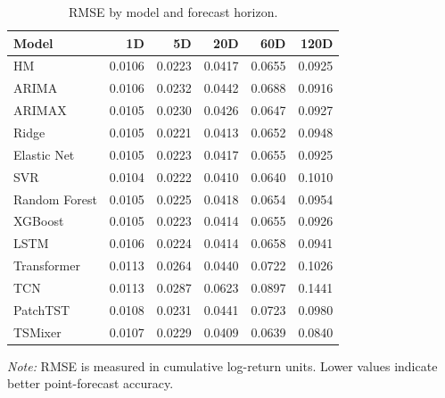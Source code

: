 \documentclass[12pt,twoside]{ord}
\begin{document}
\begin{table}[htbp]
\centering
\caption{RMSE by model and forecast horizon.}\label{tab:rmse_main}
\setlength{\tabcolsep}{4.5pt}
\begin{tabular}{lrrrrr}
\hline
Model & 1D & 5D & 20D & 60D & 120D \\
\hline
HM & 0.0106 & 0.0223 & 0.0417 & 0.0655 & 0.0925 \\
ARIMA & 0.0106 & 0.0232 & 0.0442 & 0.0688 & 0.0916 \\
ARIMAX & 0.0105 & 0.0230 & 0.0426 & 0.0647 & 0.0927 \\
Ridge & 0.0105 & 0.0221 & 0.0413 & 0.0652 & 0.0948 \\
Elastic Net & 0.0105 & 0.0223 & 0.0417 & 0.0655 & 0.0925 \\
SVR & 0.0104 & 0.0222 & 0.0410 & 0.0640 & 0.1010 \\
Random Forest & 0.0105 & 0.0225 & 0.0418 & 0.0654 & 0.0954 \\
XGBoost & 0.0105 & 0.0223 & 0.0414 & 0.0655 & 0.0926 \\
LSTM & 0.0106 & 0.0224 & 0.0414 & 0.0658 & 0.0941 \\
Transformer & 0.0113 & 0.0264 & 0.0440 & 0.0722 & 0.1026 \\
TCN & 0.0113 & 0.0287 & 0.0623 & 0.0897 & 0.1441 \\
PatchTST & 0.0108 & 0.0231 & 0.0441 & 0.0723 & 0.0980 \\
TSMixer & 0.0107 & 0.0229 & 0.0409 & 0.0639 & 0.0840 \\
\hline
\end{tabular}
\par\vspace{4pt}\parbox{0.85\linewidth}{\fontsize{9pt}{12pt}\selectfont\textit{Note:} RMSE is measured in cumulative log-return units. Lower values indicate better point-forecast accuracy.}
\end{table}
\end{document}
